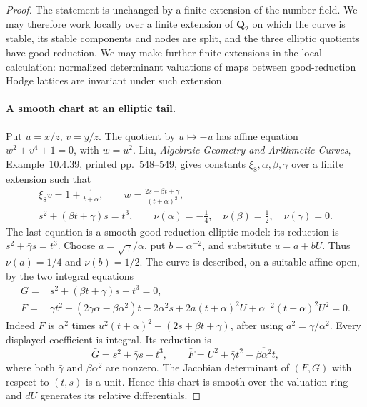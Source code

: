 \documentclass[11pt,a4paper]{article}
\begin{document}
\begin{proof}
The statement is unchanged by a finite extension of the number field.
We may therefore work locally over a finite extension of $\mathbf Q_2$
on which the curve is stable, its stable components and nodes are split,
and the three elliptic quotients have good reduction. We may make
further finite extensions in the local calculation: normalized
determinant valuations of maps between good-reduction Hodge lattices
are invariant under such extension.

\paragraph{A smooth chart at an elliptic tail.}
Put $u=x/z$, $v=y/z$. The quotient by $u\mapsto-u$ has affine
equation $w^2+v^4+1=0$, with $w=u^2$.
Liu, \emph{Algebraic Geometry and Arithmetic Curves},
Example~10.4.39, printed pp.~548--549, gives constants
$\xi_8,\alpha,\beta,\gamma$ over a finite extension such that
\[
 \begin{gathered}
 \xi_8v=1+\frac1{t+\alpha},\qquad
 w=\frac{2s+\beta t+\gamma}{(t+\alpha)^2},\\
 s^2+(\beta t+\gamma)s=t^3,\qquad
 \nu(\alpha)=-\frac14,\quad
 \nu(\beta)=\frac12,\quad \nu(\gamma)=0.
                                                        \tag{JAC.P10.2}
 \end{gathered}
\]
The last equation is a smooth good-reduction elliptic model: its
reduction is $s^2+\bar\gamma s=t^3$.
Choose $a=\sqrt\gamma/\alpha$, put $b=\alpha^{-2}$, and substitute
$u=a+bU$. Thus $\nu(a)=1/4$ and $\nu(b)=1/2$.
The curve is described, on a suitable affine open, by the two
integral equations
\[
 \begin{split}
 G={}&s^2+(\beta t+\gamma)s-t^3=0,\\
 F={}&\gamma t^2+(2\gamma\alpha-\beta\alpha^2)t
       -2\alpha^2s
       +2a(t+\alpha)^2U
       +\alpha^{-2}(t+\alpha)^2U^2=0.
 \end{split}                                             \tag{JAC.P10.3}
\]
Indeed $F$ is $\alpha^2$ times
$u^2(t+\alpha)^2-(2s+\beta t+\gamma)$, after using
$a^2=\gamma/\alpha^2$. Every displayed coefficient is integral.
Its reduction is
\[
 \bar G=s^2+\bar\gamma s-t^3,
 \qquad
 \bar F=U^2+\bar\gamma t^2-\overline{\beta\alpha^2}t,
                                                        \tag{JAC.P10.4}
\]
where both $\bar\gamma$ and $\overline{\beta\alpha^2}$ are nonzero.
The Jacobian determinant of $(F,G)$ with respect to $(t,s)$ is a
unit. Hence this chart is smooth over the valuation ring and $dU$
generates its relative differentials.


\end{proof}
\end{document}
